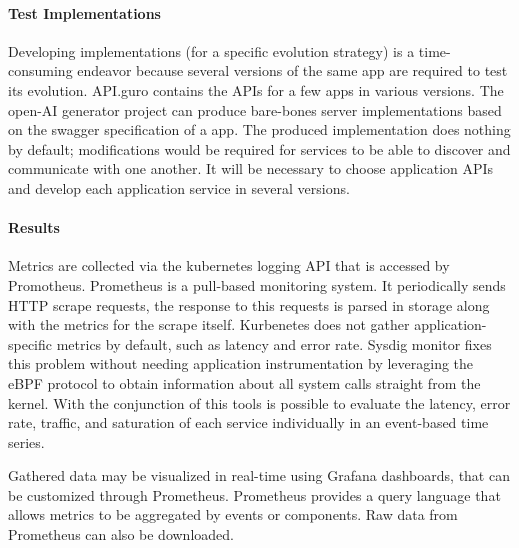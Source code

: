 \paragraph{Test Implementations}
Developing implementations (for a specific evolution strategy) is a time-consuming endeavor because several versions of the same app are required to test its evolution.
API.guro contains the APIs for a few apps in various versions.
The open-AI generator project can produce bare-bones server implementations based on the swagger specification of a app.
The produced implementation does nothing by default; modifications would be required for services to be able to discover and communicate with one another.
It will be necessary to choose application APIs and develop each application service in several versions.

\paragraph{Results}
Metrics are collected via the kubernetes logging API that is accessed by Promotheus. Prometheus is a pull-based monitoring system. It periodically sends HTTP scrape requests, the response to this requests is parsed in storage along with the metrics for the scrape itself.
Kurbenetes does not gather application-specific metrics by default, such as latency and error rate. Sysdig monitor fixes this problem without needing application instrumentation by leveraging the eBPF protocol to obtain information about all system calls straight from the kernel.
With the conjunction of this tools is possible to evaluate the latency, error rate, traffic, and saturation of each service individually in an event-based time series.

Gathered data may be visualized in real-time using Grafana dashboards, that can be customized through Prometheus.
Prometheus provides a query language that allows metrics to be aggregated by events or components.
Raw data from Prometheus can also be downloaded.